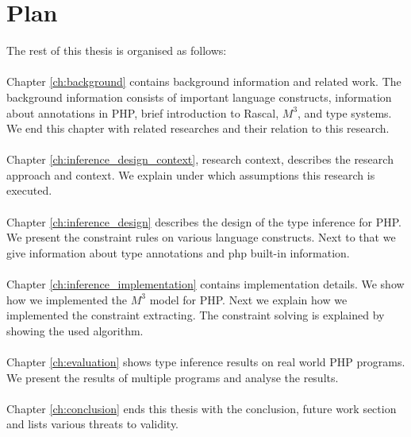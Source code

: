 \documentclass[../main.tex]{subfiles}
\begin{document}
    \section{Plan} 
        The rest of this thesis is organised as follows:
        
        \paragraph{}
        Chapter \ref{ch:background} contains background information and related work.
        The background information consists of important language constructs, information about annotations in PHP, brief introduction to Rascal, $M^3$, and type systems. 
        We end this chapter with related researches and their relation to this research.
        
        \paragraph{}
        Chapter \ref{ch:inference_design_context}, research context, describes the research approach and context.
        We explain under which assumptions this research is executed.
        
        \paragraph{}
        Chapter \ref{ch:inference_design} describes the design of the type inference for PHP.
        We present the constraint rules on various language constructs.
        Next to that we give information about type annotations and php built-in information. 
        
        \paragraph{}
        Chapter \ref{ch:inference_implementation} contains implementation details.
        We show how we implemented the $M^3$ model for PHP.
        Next we explain how we implemented the constraint extracting.
        The constraint solving is explained by showing the used algorithm.
        
        \paragraph{}
        Chapter \ref{ch:evaluation} shows type inference results on real world PHP programs.
        We present the results of multiple programs and analyse the results.
        
        \paragraph{}
        Chapter \ref{ch:conclusion} ends this thesis with the conclusion, future work section and lists various threats to validity.
        
        
\end{document}
